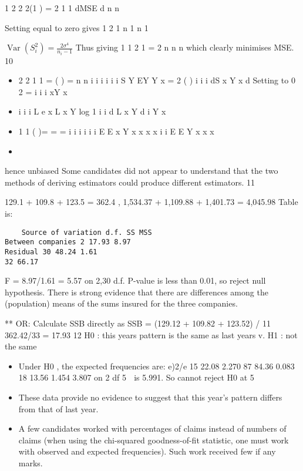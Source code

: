 \documentclass[a4paper,12pt]{article}
\begin{document}
1 2
2 2(1 )
= 2
1 1
dMSE
d n n


Setting equal to zero gives
1 2
1
n 1 n 1


${ \displaystyle \operatorname{Var}(S^2_i)  = \frac{2 \sigma^4}{n_i - 1} }$ 
Thus giving 1
1 2
1
=
2
n
n n
%
which clearly minimises MSE.
10 
\begin{itemize}
\item 2 2
1 1
= ( ) =
n n
i i i i
i i
S Y EY Y x
= 2 ( ) i i i
dS
x Y x
d
 Setting to 0  2 = i i
i
xY
x
\item %
i i i L e x L x Y %
log 1
i i
d L
x Y
d
i
Y
x%
\item %
1 1
( )= = = i i i i
i i
E E x Y x x
x x
i i
E E Y x
x x
    \item 
\end{itemize}
hence unbiased
Some candidates did not appear to understand that the two methods of deriving
estimators could produce different estimators.
11 

129.1 + 109.8 + 123.5 = 362.4 , 1,534.37 + 1,109.88 + 1,401.73 = 4,045.98
Table is:
\begin{verbatim}
    Source of variation d.f. SS MSS
Between companies 2 17.93 8.97
Residual 30 48.24 1.61
32 66.17
\end{verbatim}



F = 8.97/1.61 = 5.57 on 2,30 d.f.
P-value is less than 0.01, so reject null hypothesis.
There is strong evidence that there are differences among the (population)
means of the sums insured for the three companies.

** OR: Calculate SSB directly as
SSB = (129.12 + 109.82 + 123.52) / 11  362.42/33 = 17.93
12 H0 : this years pattern is the same as last years v. H1 : not the same
\begin{itemize}
    \item Under H0 , the expected frequencies are:
e)2/e
15 22.08 2.270
87 84.36 0.083
18 13.56 1.454
3.807 on 2 df
5%
 is 5.991. So cannot reject H0 at 5%
\item These data provide no evidence to suggest that this year’s pattern differs from
that of last year.
\item A few candidates worked with percentages of claims instead of numbers of claims
(when using the chi-squared goodness-of-fit statistic, one must work with observed
and expected frequencies). Such work received few if any marks.
\end{itemize}
\end{document}
